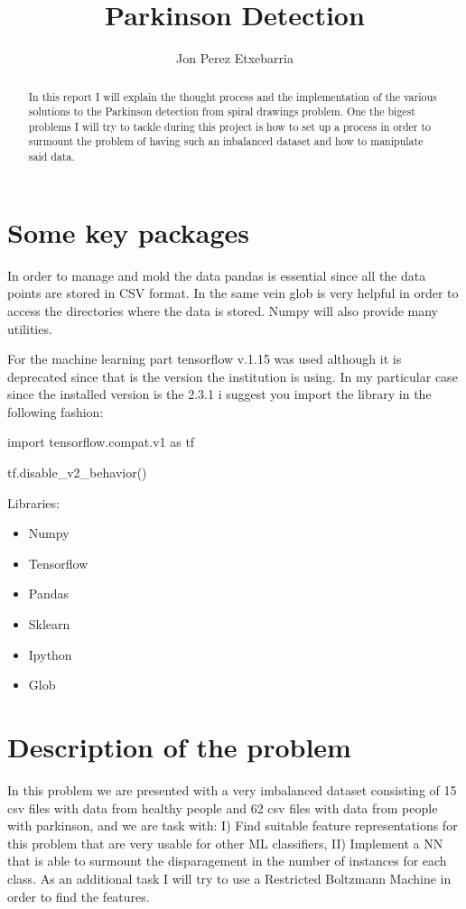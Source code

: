 \documentclass{article} %
\title{Parkinson Detection}
\author{Jon Perez Etxebarria}
\begin{document}
\maketitle
\begin{abstract}
In this report I will explain the thought process and the implementation of the various solutions to the Parkinson detection from spiral drawings problem. One the bigest problems I will try to tackle during this project is how to set up a process in order to surmount the problem of having such an inbalanced dataset and how to manipulate said data.
\end{abstract}

\bigskip
\bigskip
\bigskip

\section{Some key packages}
 
In order to manage and mold the data pandas is essential since all the data points are stored in CSV format. In the same vein glob is very helpful in order to access the directories where the data is stored. Numpy will also provide many utilities.

For the machine learning part tensorflow v.1.15 was used although it is deprecated since that is the version the institution is using. In my particular case since the installed version is the 2.3.1 i suggest you import the library in the following fashion:

import tensorflow.compat.v1 as tf
\smallskip

tf.disable\_v2\_behavior()
\smallskip

Libraries:

\begin{itemize}
  \item Numpy
  \item Tensorflow
  \item Pandas 
  \item Sklearn
  \item Ipython
  \item Glob
\end{itemize}
 
\bigskip

\section{Description of the problem}
 
In this problem we are presented with a very imbalanced dataset consisting of 15 csv files with data from healthy people and 62 csv files with data from people with parkinson, and we are task with: I) Find suitable feature representations for this problem that are very usable for other ML classifiers, II) Implement a NN that is able to surmount the disparagement in the number of instances for each class. As an additional task I will try to use a Restricted Boltzmann Machine in order to find the features.
\bigskip
\bigskip
\bigskip
\bigskip
\bigskip
\bigskip
\bigskip
\bigskip
\bigskip
\bigskip
\end{document}
